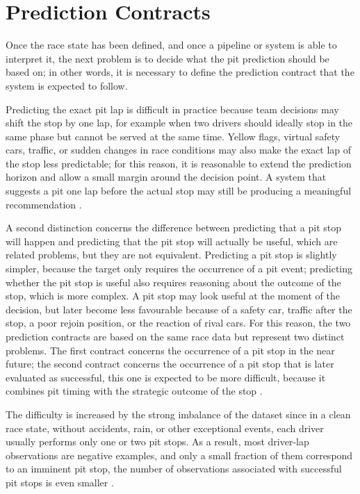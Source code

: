 \section{Prediction Contracts}
\label{sec:contracts}

Once the race state has been defined, and once a pipeline or system is able to interpret it, the next problem is to decide what the pit prediction should be based on;
in other words, it is necessary to define the prediction contract that the system is expected to follow.

Predicting the exact pit lap is difficult in practice because
team decisions may shift the stop by one lap, for example when two drivers should ideally stop in the same phase but cannot be served at the same time.
Yellow flags, virtual safety cars, traffic, or sudden changes in race conditions may also make the exact lap of the stop less predictable;
for this reason, it is reasonable to extend the prediction horizon and allow a small margin around the decision point.
A system that suggests a pit one lap before the actual stop may still be producing a meaningful recommendation \citep{hettmann2024datatopodium,sasikumar2025pitstop,dinh2025gradient}.

A second distinction concerns the difference between predicting that a pit stop will happen and predicting that the pit stop will actually be useful,
which are related problems, but they are not equivalent.
Predicting a pit stop is slightly simpler, because the target only requires the occurrence of a pit event;
predicting whether the pit stop is useful also requires reasoning about the outcome of the stop, which is more complex.
A pit stop may look useful at the moment of the decision, but later become less favourable because of a safety car, traffic after the stop, a poor 
rejoin position, or the reaction of rival cars.
For this reason, the two prediction contracts are based on the same race data but represent two distinct problems.
The first contract concerns the occurrence of a pit stop in the near future;
the second contract concerns the occurrence of a pit stop that is later evaluated as successful,
this one is expected to be more difficult, because it combines pit timing with the strategic outcome of the stop \citep{heilmeier2020race,carrasco2023optimization,sasikumar2025pitstop}.

The difficulty is increased by the strong imbalance of the dataset since
in a clean race state, without accidents, rain, or other exceptional events, each driver usually performs only one or two pit stops.
As a result, most driver-lap observations are negative examples, and only a small fraction of them correspond to an imminent pit stop,
the number of observations associated with successful pit stops is even smaller \citep{he2009imbalanced,saito2015prroc}.


